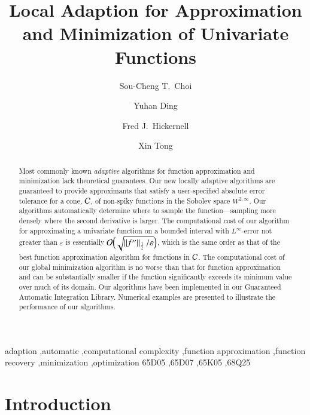 \documentclass[review]{elsarticle}
\newcommand{\abstol}{\varepsilon}
\theoremstyle{definition}
\renewcommand{\cw}{W}
\begin{document}
\begin{frontmatter}

\title{Local Adaption for Approximation and Minimization of Univariate Functions}


\author{Sou-Cheng T.~Choi}
\author{Yuhan Ding}
\author{Fred J.~Hickernell}
\address{Department of Applied Mathematics, Illinois Institute of Technology, RE 208, 10 West 32$^{\text{nd}}$ Street, Chicago, Illinois, 60616, USA}
\author{Xin Tong}
\address{Department of Mathematics, Statistics, and Computer Science, University of Illinois at Chicago, Room 322 SEO, 851 S. Morgan Street, Chicago, Illinois, 60607, USA}



\begin{abstract}
Most commonly known \emph{adaptive} algorithms for function approximation and minimization lack theoretical guarantees.  Our new locally adaptive algorithms are guaranteed to provide approximants that satisfy a user-specified absolute error tolerance for a cone, $\mathcal{C}$, of non-spiky functions in the Sobolev space $\cw^{2,\infty}$.  Our algorithms automatically determine where to sample the function---sampling more densely where the second derivative is larger.  The computational cost of our algorithm for approximating a univariate function on a bounded interval with $L^{\infty}$-error not greater than $\abstol$ is essentially $\Order\Bigl(\sqrt{\norm[\frac12]{f''}/\abstol}\Bigr)$, which is the same order as that of the best function approximation algorithm for functions in $\mathcal{C}$. The computational cost of our global minimization algorithm is no worse than that for function approximation and can be substantially smaller if the function significantly exceeds its minimum value over much of its domain.  Our  algorithms have been implemented in our Guaranteed Automatic Integration Library.  Numerical examples are presented to illustrate the performance of our algorithms.
\end{abstract}

\begin{keyword}
adaption \sep automatic \sep computational complexity \sep function approximation \sep function recovery \sep minimization \sep optimization
\MSC[2010]  65D05 \sep 65D07 \sep 65K05 \sep 68Q25
\end{keyword}

\end{frontmatter}

\section{Introduction} \label{sec:intro}
\end{document}
